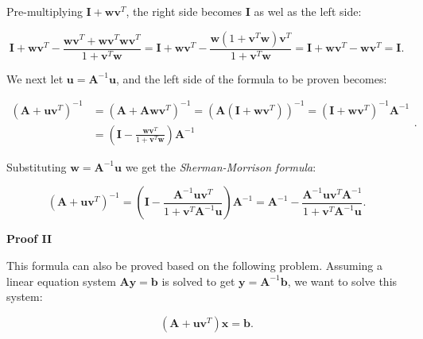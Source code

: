 \documentclass[10pt,b5paper,titlepage]{book}
\begin{document}
Pre-multiplying $\mathbf{I} + \mathbf{w}\mathbf{v}^{T}$, the right side becomes
$\mathbf{I}$ as wel as the left side:

\begin{equation}
    \mathbf{I} + \mathbf{w}\mathbf{v}^{T}
    - \frac{\mathbf{w}\mathbf{v}^{T} + \mathbf{w}\mathbf{v}^{T}\mathbf{w}\mathbf{v}^{T}}
    {1 + \mathbf{v}^{T}\mathbf{w}}
    = \mathbf{I} + \mathbf{w}\mathbf{v}^{T}
    - \frac{\mathbf{w}(1 + \mathbf{v}^{T}\mathbf{w})\mathbf{v}^{T}}
    {1 + \mathbf{v}^{T}\mathbf{w}}
    = \mathbf{I} + \mathbf{w}\mathbf{v}^{T} - \mathbf{w}\mathbf{v}^{T} = \mathbf{I}
.\end{equation}

We next let $\mathbf{u} = \mathbf{A}^{-1}\mathbf{u}$, and the left side of the
formula to be proven becomes:

\begin{equation}
    \begin{array}{ll}
        (\mathbf{A}+\mathbf{u}\mathbf{v}^{T})^{-1}
        &= (\mathbf{A} + \mathbf{A}\mathbf{w}\mathbf{v}^{T})^{-1}
        = (\mathbf{A}(\mathbf{I}+\mathbf{w}\mathbf{v}^{T}))^{-1}
        = (\mathbf{I}+\mathbf{w}\mathbf{v}^{T})^{-1}\mathbf{A}^{-1}\\
        &= \left( \mathbf{I}
        - \frac{\mathbf{w}\mathbf{v}^{T}}{1+\mathbf{v}^{T}\mathbf{w}}\right) \mathbf{A}^{-1}
    \end{array}
.\end{equation}

Substituting $\mathbf{w} = \mathbf{A}^{-1}\mathbf{u}$ we get the
\textit{Sherman-Morrison formula}:

\begin{equation}
    (\mathbf{A}+\mathbf{u}\mathbf{v}^{T})^{-1}
    = \left( \mathbf{I}
    - \frac{\mathbf{A}^{-1}\mathbf{u}\mathbf{v}^{T}}
    {1+\mathbf{v}^{T}\mathbf{A}^{-1}\mathbf{u}} \right) \mathbf{A}^{-1}
    = \mathbf{A}^{-1}
    - \frac{\mathbf{A}^{-1}\mathbf{u}\mathbf{v}^{T}\mathbf{A}^{-1}}
    {1 + \mathbf{v}^{T}\mathbf{A}^{-1}\mathbf{u}}
.\end{equation}

\textbf{Proof II}

This formula can also be proved based on the following problem. Assuming a linear
equation system $\mathbf{A}\mathbf{y} = \mathbf{b}$ is solved to get
$\mathbf{y} = \mathbf{A}^{-1}\mathbf{b}$, we want to solve this system:

\begin{equation}
    (\mathbf{A} + \mathbf{u}\mathbf{v}^{T})\mathbf{x} = \mathbf{b}
.\end{equation}
\end{document}
